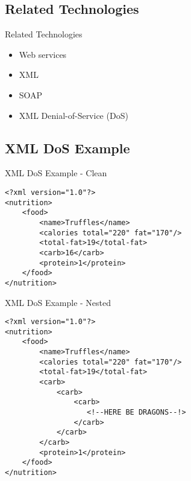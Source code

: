 \documentclass{beamer}
\begin{document}
\subsection{Related Technologies}
\begin{frame}{Related Technologies}
    \begin{itemize}
        \item Web services
        \vspace{5mm}
        \item XML
        \vspace{5mm}
        \item SOAP
        \vspace{5mm}
        \item XML Denial-of-Service (DoS)
    \end{itemize}

\end{frame}


\subsection{XML DoS Example}
\begin{frame}[fragile]{XML DoS Example - Clean}
    \lstset{language=XML}
    \begin{lstlisting}
<?xml version="1.0"?>
<nutrition>
    <food>
        <name>Truffles</name>
        <calories total="220" fat="170"/>
        <total-fat>19</total-fat>
        <carb>16</carb>
        <protein>1</protein>
    </food>
</nutrition>
    \end{lstlisting}

\end{frame}


\begin{frame}[fragile]{XML DoS Example - Nested}
    \lstset{language=XML}
    \begin{lstlisting}
<?xml version="1.0"?>
<nutrition>
    <food>
        <name>Truffles</name>
        <calories total="220" fat="170"/>
        <total-fat>19</total-fat>
        <carb>
            <carb>
                <carb>
                   <!--HERE BE DRAGONS--!>
                </carb>
            </carb>
        </carb>
        <protein>1</protein>
    </food>
</nutrition>
    \end{lstlisting}

\end{frame}
\end{document}
